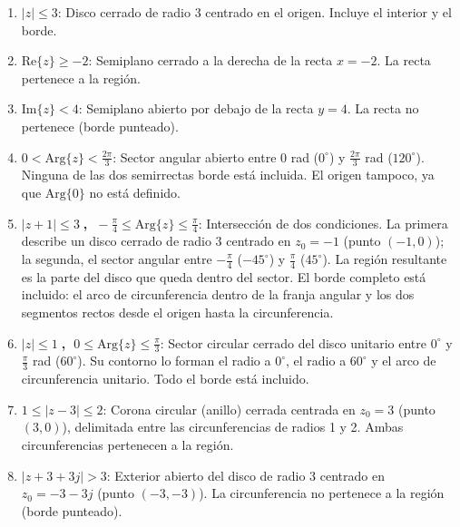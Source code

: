\documentclass[10pt,a4paper]{article}
\begin{document}
\begin{enumerate}[label=\textbf{\alph*)}]
	\item \textbf{$|z| \leq 3$}: Disco cerrado de radio 3 centrado en el origen. Incluye el interior y el borde.

	\item \textbf{$\mathrm{Re}\{z\} \geq -2$}: Semiplano cerrado a la derecha de la recta $x = -2$. La recta pertenece a la región.

	\item \textbf{$\mathrm{Im}\{z\} < 4$}: Semiplano abierto por debajo de la recta $y = 4$. La recta no pertenece (borde punteado).

	\item \textbf{$0 < \mathrm{Arg}\{z\} < \frac{2\pi}{3}$}: Sector angular abierto entre $0$ rad ($0^\circ$) y $\frac{2\pi}{3}$ rad ($120^\circ$). Ninguna de las dos semirrectas borde está incluida. El origen tampoco, ya que $\mathrm{Arg}\{0\}$ no está definido.

	\item \textbf{$|z+1| \leq 3\;$, $\;-\frac{\pi}{4} \leq \mathrm{Arg}\{z\} \leq \frac{\pi}{4}$}: Intersección de dos condiciones. La primera describe un disco cerrado de radio 3 centrado en $z_0 = -1$ (punto $(-1,0)$); la segunda, el sector angular entre $-\frac{\pi}{4}$ ($-45^\circ$) y $\frac{\pi}{4}$ ($45^\circ$). La región resultante es la parte del disco que queda dentro del sector. El borde completo está incluido: el arco de circunferencia dentro de la franja angular y los dos segmentos rectos desde el origen hasta la circunferencia.

	\item \textbf{$|z| \leq 1\;$, $\;0 \leq \mathrm{Arg}\{z\} \leq \frac{\pi}{3}$}: Sector circular cerrado del disco unitario entre $0^\circ$ y $\frac{\pi}{3}$ rad ($60^\circ$). Su contorno lo forman el radio a $0^\circ$, el radio a $60^\circ$ y el arco de circunferencia unitario. Todo el borde está incluido.

	\item \textbf{$1 \leq |z-3| \leq 2$}: Corona circular (anillo) cerrada centrada en $z_0 = 3$ (punto $(3,0)$), delimitada entre las circunferencias de radios 1 y 2. Ambas circunferencias pertenecen a la región.

	\item \textbf{$|z+3+3j| > 3$}: Exterior abierto del disco de radio 3 centrado en $z_0 = -3-3j$ (punto $(-3,-3)$). La circunferencia no pertenece a la región (borde punteado).
\end{enumerate}
\end{document}
